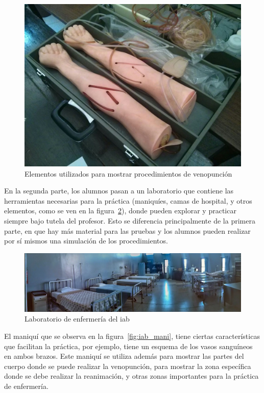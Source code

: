 \begin{figure}[h!t] 
\centering 
\includegraphics[scale=0.2,natwidth=100,natheight=100]{problema/iab_sala_2.jpg}
\caption{Elementos utilizados para mostrar procedimientos de venopunción}
\label{fig:iab_veno}
\end{figure}

En la segunda parte, los alumnos pasan a un laboratorio que contiene las
herramientas necesarias para la práctica (maniquíes, camas de hospital, y otros
elementos, como se ven en la figura~\ref{fig:iab_lab}), donde pueden explorar y
practicar siempre bajo tutela del profesor. Esto se diferencia
principalmente de la primera parte, en que hay más material para las pruebas y los
alumnos pueden realizar por sí mismos una simulación de los procedimientos.

\begin{figure}[h!t] 
\centering 
\includegraphics[scale=0.3]{problema/iab_sala_1.jpg}
\caption{Laboratorio de enfermería del \Gls{iab}}
\label{fig:iab_lab}
\end{figure}


El maniquí que se observa en la figura~\ref{fig:iab_mani}, tiene ciertas
características que facilitan la práctica, por ejemplo, tiene un esquema de los
vasos sanguíneos en ambos brazos. Este maniquí se utiliza además para mostrar
las partes del cuerpo donde se puede realizar la venopunción, para mostrar la
zona específica donde se debe realizar la reanimación, y otras zonas importantes
para la práctica de enfermería.


